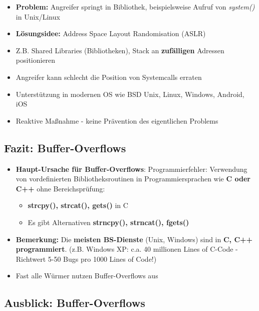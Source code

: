 \documentclass[openany]{book}
\begin{document}
\begin{itemize}
    \item \textbf{Problem:} Angreifer springt in Bibliothek, beispielsweise Aufruf von \textit{system()} in Unix/Linux
    \item \textbf{Lösungsidee:} Address Space Layout Randomisation (ASLR)
    \item Z.B. Shared Libraries (Bibliotheken), Stack an \textbf{zufälligen} Adressen positionieren
    \item Angreifer kann schlecht die Position von Systemcalls erraten
    \item Unterstützung in modernen OS wie BSD Unix, Linux, Windows, Android, iOS
    \item Reaktive Maßnahme - keine Prävention des eigentlichen Problems
\end{itemize}

\subsection{Fazit: Buffer-Overflows}

\begin{itemize}
    \item \textbf{Haupt-Ursache für Buffer-Overflows}: Programmierfehler: Verwendung von vordefinierten Bibliotheksroutinen in Programmiersprachen wie \textbf{C oder C++} ohne Bereichsprüfung:
    \begin{itemize}
        \item \textbf{strcpy(), strcat(), gets()} in C
        \item Es gibt Alternativen \textbf{strncpy(), strncat(), fgets()}
    \end{itemize}
    \item \textbf{Bemerkung:} Die \textbf{meisten BS-Dienste} (Unix, Windows) sind in \textbf{C, C++ programmiert}. (z.B. Windows XP: c.a. 40 millionen Lines of C-Code - Richtwert 5-50 Bugs pro 1000 Lines of Code!)
    \item Fast alle Würmer nutzen Buffer-Overflows aus
\end{itemize}

\subsection{Ausblick: Buffer-Overflows}
\end{document}
